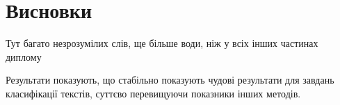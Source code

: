 \section{Висновки}

Тут багато незрозумілих слів, ще більше води, ніж у всіх інших частинах диплому

Результати показують, що стабільно показують чудові результати для завдань класифікації
текстів, суттєво перевищуючи показники інших методів.
